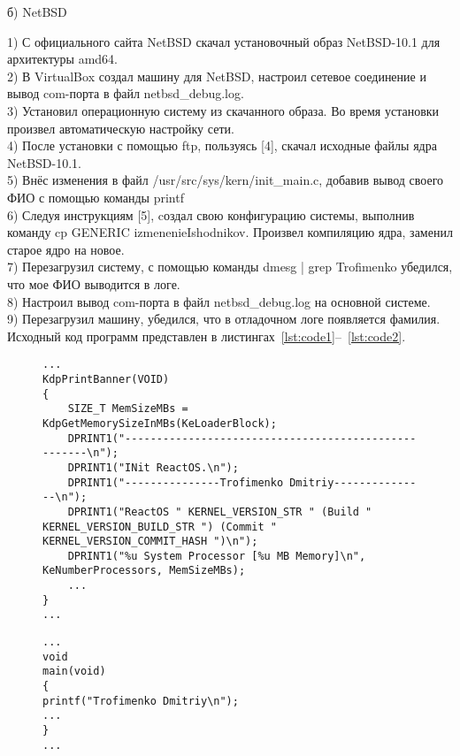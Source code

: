 \documentclass[a4paper, 14pt]{extarticle}
\begin{document}
\begin{center}
б) NetBSD
\end{center}
1) С официального сайта NetBSD скачал установочный образ NetBSD-10.1
для архитектуры amd64.\\
2) В VirtualBox создал машину для NetBSD, настроил сетевое соединение
и вывод com-порта в файл netbsd\_debug.log.\\
3) Установил операционную систему из скачанного образа. Во время
установки произвел автоматическую настройку сети.\\
4) После установки с помощью ftp, пользуясь [4], скачал исходные файлы
ядра NetBSD-10.1.\\
5) Внёс изменения в файл /usr/src/sys/kern/init\_main.c, добавив вывод
своего ФИО с помощью команды printf\\
6) Следуя инструкциям [5], cоздал свою конфигурацию системы,
выполнив команду cp GENERIC izmenenieIshodnikov. Произвел
компиляцию ядра, заменил старое ядро на новое.\\
7) Перезагрузил систему, с помощью команды dmesg | grep Trofimenko
убедился, что мое ФИО выводится в логе.\\
8) Настроил вывод com-порта в файл netbsd\_debug.log на основной системе.\\
9) Перезагрузил машину, убедился, что в отладочном логе
появляется фамилия.\\


Исходный код программ представлен в листингах~\ref{lst:code1}--~\ref{lst:code2}.
\begin{figure}[!htb]
\begin{lstlisting}[language={},caption={
kdinit.c (ReactOS).},label={lst:code1}]
...
KdpPrintBanner(VOID)
{
    SIZE_T MemSizeMBs = KdpGetMemorySizeInMBs(KeLoaderBlock);
    DPRINT1("-----------------------------------------------------\n");
    DPRINT1("INit ReactOS.\n");
    DPRINT1("---------------Trofimenko Dmitriy---------------\n");
    DPRINT1("ReactOS " KERNEL_VERSION_STR " (Build " KERNEL_VERSION_BUILD_STR ") (Commit " KERNEL_VERSION_COMMIT_HASH ")\n");
    DPRINT1("%u System Processor [%u MB Memory]\n", KeNumberProcessors, MemSizeMBs);
    ...
}
...

\end{lstlisting}
\end{figure}

\begin{figure}[!htb]
\begin{lstlisting}[language={},caption={
init\_main.c (NetBSD).},label={lst:code2}]
...
void 
main(void)
{
printf("Trofimenko Dmitriy\n");
...
}
...

\end{lstlisting}
\end{figure}
\end{document}
